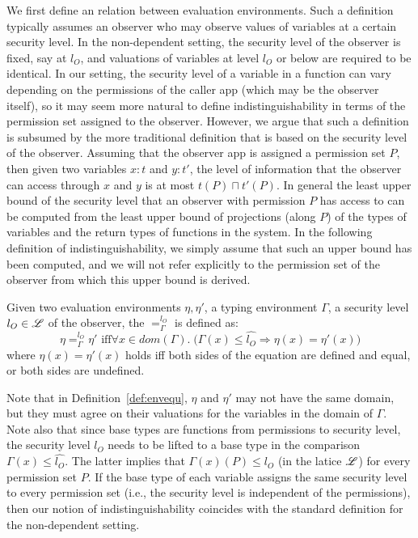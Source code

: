 {{{We first define an  relation between evaluation environments.
Such a definition typically assumes an observer who may observe values of variables at a certain security level.
In the non-dependent setting, the security level of the observer is fixed, say at $l_O$, and valuations
of variables at level $l_O$ or below are required to be identical. In our setting, the security level of
a variable in a function can vary depending on the permissions of the caller app (which may be the observer itself), so
it may seem more natural to define indistinguishability in terms of the permission set assigned to the observer. However,
we argue that such a definition is subsumed by the  
more traditional definition that is based on the security level of the observer.
Assuming that the observer app is assigned a permission set $P$, 
then given two variables $x : t$ and $y : t'$,
the level of information that the observer can access through $x$ and $y$ is at most $t(P) \sqcap t'(P).$
In general the least upper bound of the security level that an observer with permission $P$ has access to can
be computed from the least upper bound of projections (along $P$) of the types of variables and the return types
of functions in the system.
In the following definition of indistinguishability, we simply assume that
such an upper bound has been computed, and we will not refer explicitly to the permission set of the observer from
which this upper bound is derived.


\begin{definition}\label{def:envequ}
Given two evaluation environments $\eta, \eta'$,
a typing environment $\Gamma$, a security level $l_O \in \mathscr{L}$ of the observer,
the {}  $=_{\Gamma}^{l_O}$ is defined as: \begin{equation*}
\eta =_{\Gamma}^{l_{O}} \eta' \text{ iff}
\forall x\in dom(\Gamma) .\; \big(\Gamma(x) \leq \hat{l_{O}} \Rightarrow \eta(x) = \eta'(x) \big)
\end{equation*}
where
$\eta(x) = \eta'(x)$ holds iff both sides of the equation are defined and equal,
or both sides are undefined.
\end{definition}

Note that in Definition~\ref{def:envequ}, $\eta$ and $\eta'$ may not have the same domain, but they must agree on
their valuations for the variables in the domain of $\Gamma$. 
Note also that since base types are functions from permissions to security level, the security
level $l_O$ needs to be lifted to a base type in the comparison $\Gamma(x) \leq \hat{l_{O}}$.
The latter implies that
$\Gamma(x)(P) \leq l_O$ (in the latice $\mathscr{L}$) for every permission set $P.$
If the base type of each variable assigns the same security level to every permission set (i.e., the security level
is independent of the permissions), then our notion of indistinguishability coincides with the standard definition
for the non-dependent setting.



}}}
